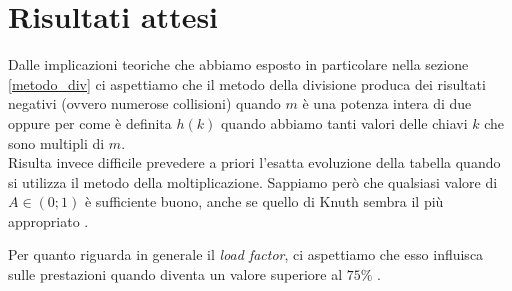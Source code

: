 \section{Risultati attesi} \label{ris_attesi}
Dalle implicazioni teoriche che abbiamo esposto in particolare nella sezione \ref{metodo_div} ci aspettiamo che il metodo della divisione produca dei risultati negativi (ovvero numerose collisioni) quando $m$ è una potenza intera di due oppure per come è definita $h(k)$ quando abbiamo tanti valori delle chiavi $k$ che sono multipli di $m$.
\\Risulta invece difficile prevedere a priori l'esatta evoluzione della tabella quando si utilizza il metodo della moltiplicazione. Sappiamo però che qualsiasi valore di $A \in (0;1)$ è sufficiente buono, anche se quello di Knuth sembra il più appropriato \cite{textbook}\cite{fibo_hash}.

Per quanto riguarda in generale il \textit{load factor}, ci aspettiamo che esso influisca sulle prestazioni quando diventa un valore superiore al $75 \%$ \cite{wikipedia}.